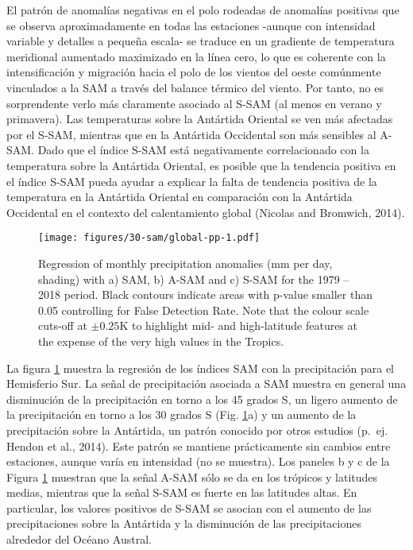 \documentclass[12pt,oneside]{reedthesis}
\begin{document}
El patrón de anomalías negativas en el polo rodeadas de anomalías positivas que se observa aproximadamente en todas las estaciones -aunque con intensidad variable y detalles a pequeña escala- se traduce en un gradiente de temperatura meridional aumentado maximizado en la línea cero, lo que es coherente con la intensificación y migración hacia el polo de los vientos del oeste comúnmente vinculados a la SAM a través del balance térmico del viento.
Por tanto, no es sorprendente verlo más claramente asociado al S\nobreakdash-SAM (al menos en verano y primavera).
Las temperaturas sobre la Antártida Oriental se ven más afectadas por el S\nobreakdash-SAM, mientras que en la Antártida Occidental son más sensibles al A\nobreakdash-SAM.
Dado que el índice S\nobreakdash-SAM está negativamente correlacionado con la temperatura sobre la Antártida Oriental, es posible que la tendencia positiva en el índice S\nobreakdash-SAM pueda ayudar a explicar la falta de tendencia positiva de la temperatura en la Antártida Oriental en comparación con la Antártida Occidental en el contexto del calentamiento global (Nicolas and Bromwich, 2014).


\begin{figure}
\centering
\texttt{[image: figures/30-sam/global-pp-1.pdf]}
\caption{\label{fig:global-pp}Regression of monthly precipitation anomalies (mm per day, shading) with a) SAM, b) A-SAM and c) S-SAM for the 1979 -- 2018 period. Black contours indicate areas with p-value smaller than 0.05 controlling for False Detection Rate. Note that the colour scale cuts-off at \(\pm0.25 \mathrm{K}\) to highlight mid- and high-latitude features at the expense of the very high values in the Tropics.}
\end{figure}
La figura \ref{fig:global-pp} muestra la regresión de los índices SAM con la precipitación para el Hemisferio Sur. La señal de precipitación asociada a SAM muestra en general una disminución de la precipitación en torno a los 45 grados S, un ligero aumento de la precipitación en torno a los 30 grados S (Fig. \ref{fig:global-pp}a) y un aumento de la precipitación sobre la Antártida, un patrón conocido por otros estudios (p.~ej. Hendon et al., 2014).
Este patrón se mantiene prácticamente sin cambios entre estaciones, aunque varía en intensidad (no se muestra).
Los paneles b y c de la Figura \ref{fig:global-pp} muestran que la señal A\nobreakdash-SAM sólo se da en los trópicos y latitudes medias, mientras que la señal S\nobreakdash-SAM es fuerte en las latitudes altas.
En particular, los valores positivos de S\nobreakdash-SAM se asocian con el aumento de las precipitaciones sobre la Antártida y la disminución de las precipitaciones alrededor del Océano Austral.
\end{document}
